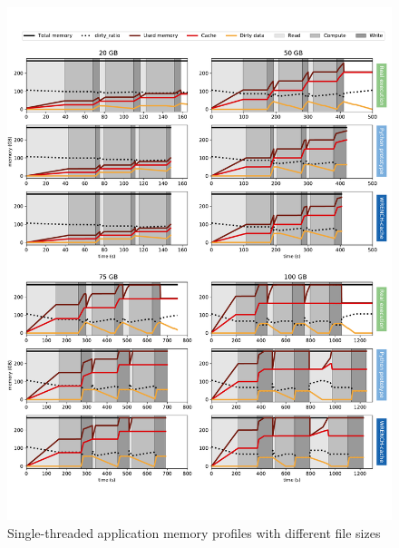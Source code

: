 \begin{figure}[!h]
   \centering
      \includegraphics[width=\linewidth]{figures/single_memprof_full.pdf}
      \caption{Single-threaded application memory profiles with different file sizes}
      \label{fig:single_memprof}
\end{figure}

